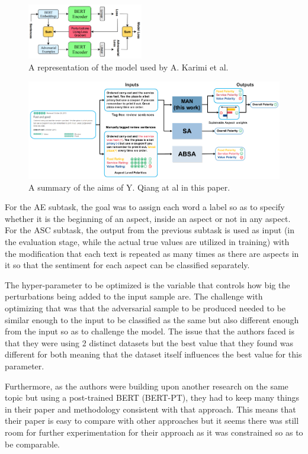 \documentclass[conference]{IEEEtran}
\begin{document}
\begin{figure}[htbp]
\centerline{\includegraphics[keepaspectratio, width=0.45\textwidth]{pics/1.png}}
\caption{A representation of the model used by A. Karimi et al.}
\label{fig}
\end{figure}

\begin{figure}
\centerline{\includegraphics[keepaspectratio, width=\textwidth]{pics/2.png}}
  \caption{A summary of the aims of Y. Qiang at al in this paper.}
\end{figure}

For the AE subtask, the goal was to assign each word a label so as to specify whether it is the beginning of an aspect, inside an aspect or not in any aspect. For the ASC subtask, the output from the previous subtask is used as input (in the evaluation stage, while the actual true values are utilized in training) with the modification that each text is repeated as many times as there are aspects in it so that the sentiment for each aspect can be classified separately.

The hyper-parameter to be optimized is the variable that controls how big the perturbations being added to the input sample are. The challenge with optimizing that was that the adversarial sample to be produced needed to be similar enough to the input to be classified as the same but also different enough from the input so as to challenge the model. The issue that the authors faced is that they were using 2 distinct datasets but the best value that they found was different for both meaning that the dataset itself influences the best value for this parameter.

Furthermore, as the authors were building upon another research on the same topic but using a post-trained BERT (BERT-PT), they had to keep many things in their paper and methodology consistent with that approach. This means that their paper is easy to compare with other approaches but it seems there was still room for further experimentation for their approach as it was constrained so as to be comparable.
\end{document}
